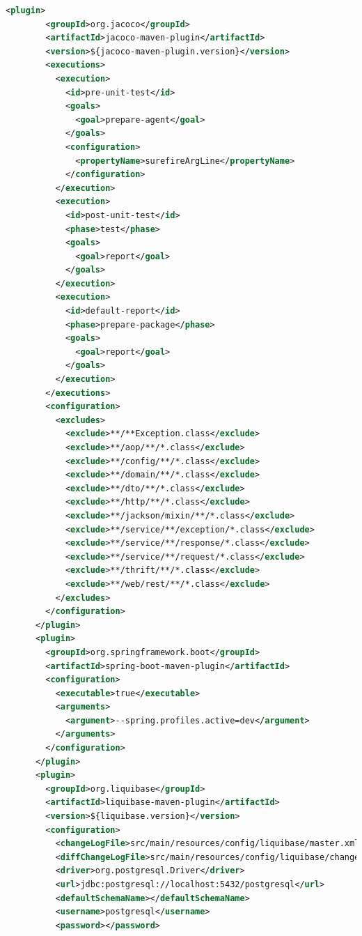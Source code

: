 \documentclass[11pt,a4paper]{article}
\begin{document}
\begin{lstlisting}[language=xml]
      <plugin>
        <groupId>org.jacoco</groupId>
        <artifactId>jacoco-maven-plugin</artifactId>
        <version>${jacoco-maven-plugin.version}</version>
        <executions>
          <execution>
            <id>pre-unit-test</id>
            <goals>
              <goal>prepare-agent</goal>
            </goals>
            <configuration>
              <propertyName>surefireArgLine</propertyName>
            </configuration>
          </execution>
          <execution>
            <id>post-unit-test</id>
            <phase>test</phase>
            <goals>
              <goal>report</goal>
            </goals>
          </execution>
          <execution>
            <id>default-report</id>
            <phase>prepare-package</phase>
            <goals>
              <goal>report</goal>
            </goals>
          </execution>
        </executions>
        <configuration>
          <excludes>
            <exclude>**/**Exception.class</exclude>
            <exclude>**/aop/**/*.class</exclude>
            <exclude>**/config/**/*.class</exclude>
            <exclude>**/domain/**/*.class</exclude>
            <exclude>**/dto/**/*.class</exclude>
            <exclude>**/http/**/*.class</exclude>
            <exclude>**/jackson/mixin/**/*.class</exclude>
            <exclude>**/service/**/exception/*.class</exclude>
            <exclude>**/service/**/response/*.class</exclude>
            <exclude>**/service/**/request/*.class</exclude>
            <exclude>**/thrift/**/*.class</exclude>
            <exclude>**/web/rest/**/*.class</exclude>
          </excludes>
        </configuration>
      </plugin>
      <plugin>
        <groupId>org.springframework.boot</groupId>
        <artifactId>spring-boot-maven-plugin</artifactId>
        <configuration>
          <executable>true</executable>
          <arguments>
            <argument>--spring.profiles.active=dev</argument>
          </arguments>
        </configuration>
      </plugin>
      <plugin>
        <groupId>org.liquibase</groupId>
        <artifactId>liquibase-maven-plugin</artifactId>
        <version>${liquibase.version}</version>
        <configuration>
          <changeLogFile>src/main/resources/config/liquibase/master.xml</changeLogFile>
          <diffChangeLogFile>src/main/resources/config/liquibase/changelog/${maven.build.timestamp}_changelog.xml</diffChangeLogFile>
          <driver>org.postgresql.Driver</driver>
          <url>jdbc:postgresql://localhost:5432/postgresql</url>
          <defaultSchemaName></defaultSchemaName>
          <username>postgresql</username>
          <password></password>

\end{lstlisting}
\end{document}

